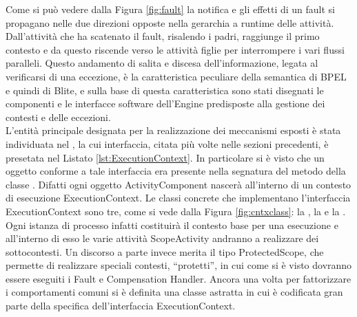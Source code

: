 Come si può vedere dalla Figura \ref{fig:fault} la notifica e gli effetti di un
fault si propagano nelle due direzioni opposte nella gerarchia a runtime delle
attività. Dall'attività che ha scatenato il fault, risalendo i padri, raggiunge
il primo contesto e da questo riscende verso le attività figlie per
interrompere i vari flussi paralleli. Questo andamento di salita e discesa dell'informazione,
legata al verificarsi di una eccezione, \`e la caratteristica peculiare della
semantica di BPEL e quindi di Blite, e sulla base di questa caratteristica sono
stati disegnati le componenti e le interfacce software dell'Engine predisposte
alla gestione dei contesti e delle eccezioni.
\\

L'entità principale designata per la realizzazione dei meccanismi esposti \`e
stata individuata nel , la cui interfaccia, citata più
volte nelle sezioni precedenti, è presetata nel Listato
\ref{lst:ExecutionContext}. In particolare si \`e visto che un oggetto conforme a
tale interfaccia era presente nella segnatura del metodo
 della classe .
Difatti ogni oggetto ActivityComponent nascerà all'interno di un contesto di
esecuzione ExecutionContext. Le classi concrete che implementano l'interfaccia
ExecutionContext sono tre, come si vede dalla Figura \ref{fig:cntxclass}: la
, la  e la .
Ogni istanza di processo infatti costituirà il contesto base per una esecuzione e
all'interno di esso le varie attività ScopeActivity andranno a realizzare dei
sottocontesti. Un discorso a parte invece merita il tipo ProtectedScope, che
permette di realizzare speciali contesti, ``protetti'', in cui come si è visto
dovranno essere eseguiti i Fault e Compensation Handler. Ancora una volta per
fattorizzare i comportamenti comuni si \`e definita una classe astratta
 in cui è codificata gran parte della specifica
dell'interfaccia ExecutionContext.


